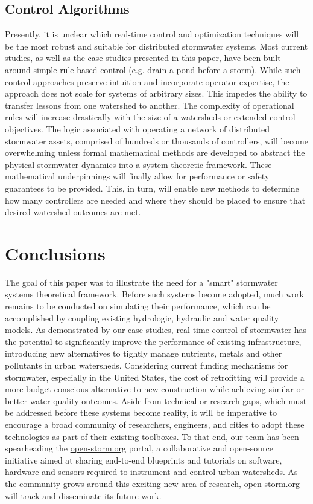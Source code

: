 \subsection{Control Algorithms}
Presently, it is unclear which real-time control and optimization techniques will be the most robust and suitable for distributed stormwater systems.  Most current studies, as well as the case studies presented in this paper, have been built around simple rule-based control (e.g. drain a pond before a storm). While such control approaches preserve intuition and incorporate operator expertise, the approach does not scale for systems of arbitrary sizes. This impedes the ability to transfer lessons from one watershed to another. The complexity of operational rules will increase drastically with the size of a watersheds or extended control objectives. The logic associated with operating a network of distributed stormwater assets, comprised of hundreds or thousands of controllers, will become overwhelming unless formal mathematical methods are developed to abstract the physical stormwater dynamics into a system-theoretic framework. These mathematical underpinnings will finally allow for performance or safety guarantees to be provided. This, in turn, will enable new methods to determine how many controllers are needed and where they should be placed to ensure that desired watershed outcomes are met. 

\section{Conclusions}
The goal of this paper was to illustrate the need for a "smart" stormwater systems theoretical framework. Before such systems become adopted, much work remains to be conducted on simulating their performance, which can be accomplished by coupling existing hydrologic, hydraulic and water quality models. As demonstrated by our case studies, real-time control of stormwater has the potential to significantly improve the performance of existing infrastructure, introducing new alternatives to tightly manage nutrients, metals and other pollutants in urban watersheds. Considering current funding mechanisms for stormwater, especially in the United States, the cost of retrofitting will provide a more budget-conscious alternative to new construction while achieving similar or better water quality outcomes. Aside from technical or research gaps, which must be addressed before these systems become reality, it will be imperative to encourage a broad community of researchers, engineers, and cities to adopt these technologies as part of their existing toolboxes. To that end, our team has been spearheading the \href{http://open-storm.org}{open-storm.org} portal, a collaborative and open-source initiative aimed at sharing end-to-end blueprints and tutorials on software, hardware and sensors required to instrument and control urban watersheds. As the community grows around this exciting new area of research, \href{http://open-storm.org}{open-storm.org} will track and disseminate its future work.

